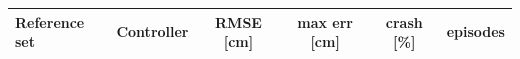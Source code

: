 \begin{tabular}{llcccc}\toprule
Reference set & Controller & RMSE [cm] & max err [cm] & crash [\%] & episodes\\\midrule

\bottomrule\end{tabular}
